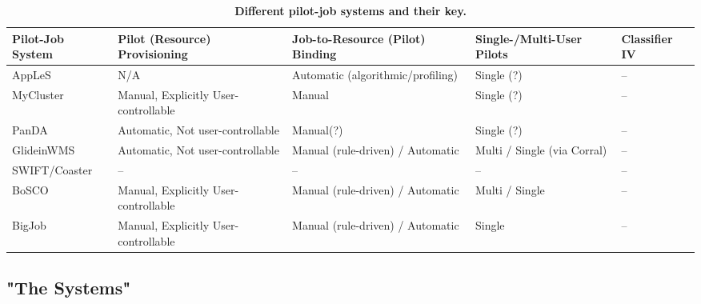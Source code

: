 \documentclass{sig-alternate}
\begin{document}
\begin{table}[t]
 \up
 \centering
 \begin{tabular}{|p{3cm}|p{3.2cm}|p{3cm}|p{3cm}|p{3cm}|}
  \hline
  \textbf{Pilot-Job System} &\textbf{Pilot (Resource) Provisioning}    &\textbf{Job-to-Resource (Pilot) Binding}  &\textbf{Single-/Multi-User Pilots} &\textbf{Classifier IV}  \\
  \hline
          AppLeS            & N/A                                      & Automatic (algorithmic/profiling)  & Single (?) & --                     \\
  \hline
          MyCluster         & Manual, Explicitly User-controllable     & Manual                             & Single (?)                  & --                     \\
  \hline
          PanDA             & Automatic, Not user-controllable         & Manual(?)                          & Single (?)      & --                     \\
  \hline
          GlideinWMS        & Automatic, Not user-controllable         & Manual (rule-driven) / Automatic   & Multi / Single (via Corral) & --                     \\
  \hline
          SWIFT/Coaster     & --                                       & --                                 & --                          & --                     \\
 \hline
          BoSCO             & Manual, Explicitly User-controllable     & Manual (rule-driven) / Automatic   & Multi / Single              & --                     \\
 \hline
          BigJob             & Manual, Explicitly User-controllable     & Manual (rule-driven) / Automatic   & Single              & --                     \\
 \hline
 \end{tabular}
 \caption{\textbf{Different pilot-job systems and their key.
 }
 \up}
 \label{table:bigjob-saga-diane}
\end{table}

\subsection{"The Systems"}
\end{document}
